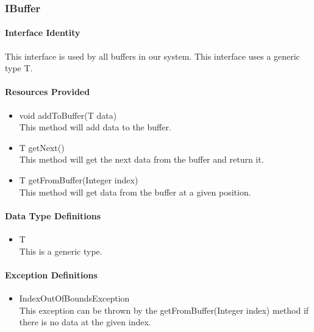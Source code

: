 \subsubsection{IBuffer}
\paragraph{Interface Identity}
This interface is used by all buffers in our system. This interface uses
	a generic type T.
\paragraph{Resources Provided}
\begin{itemize}
	\item{void addToBuffer(T data)}\\
	This method will add data to the buffer.
	\item{T getNext()}\\
	This method will get the next data from the buffer and return it.
	\item{T getFromBuffer(Integer index)}\\
	This method will get data from the buffer at a given position.
\end{itemize}
\paragraph{Data Type Definitions}
\begin{itemize}
	\item T\\
	This is a generic type.
\end{itemize}
\paragraph{Exception Definitions}
\begin{itemize}
	\item IndexOutOfBoundsException\\
	This exception can be thrown by the getFromBuffer(Integer index) method if
		there is no data at the given index.
\end{itemize}
